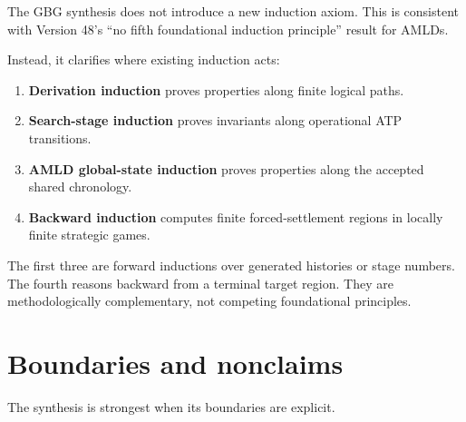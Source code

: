 \documentclass[11pt]{article}
\theoremstyle{remark}
\begin{document}
The GBG synthesis does not introduce a new induction axiom. This is consistent with Version 48's ``no fifth foundational induction principle'' result for AMLDs.

Instead, it clarifies where existing induction acts:
\begin{enumerate}[leftmargin=2em]
\item \textbf{Derivation induction} proves properties along finite logical paths.
\item \textbf{Search-stage induction} proves invariants along operational ATP transitions.
\item \textbf{AMLD global-state induction} proves properties along the accepted shared chronology.
\item \textbf{Backward induction} computes finite forced-settlement regions in locally finite strategic games.
\end{enumerate}

The first three are forward inductions over generated histories or stage numbers. The fourth reasons backward from a terminal target region. They are methodologically complementary, not competing foundational principles.

\section{Boundaries and nonclaims}

The synthesis is strongest when its boundaries are explicit.
\end{document}
